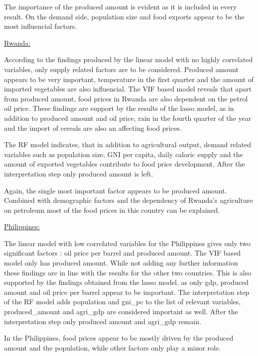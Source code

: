 \documentclass[12pt,a4paper,english]{article}
\begin{document}
The importance of the produced amount is evident as it is included in every result. On the demand side, population size and food exports appear to be the most influencial factors. 

\begin{center} \underline{Rwanda:} \end{center}
According to the findings produced by the linear model with no highly correlated variables, only supply related factors are to be considered. Produced amount appears to be very important, temperature in the first quarter and the amount of imported vegetables are also influencial.
The VIF based model reveals that apart from produced amount, food prices in Rwanda are also dependent on the petrol oil price. 
These findings are support by the results of the lasso model, as in addition to produced amount and oil price, rain in the fourth quarter of the year and the import of cereals are also an affecting food prices.

The RF model indicates, that in addition to agricultural output, demand related variables such as population size, GNI per capita, daily caloric supply and the amount of exported vegetables contribute to food price development. After the interpretation step only produced amount is left.

Again, the single most important factor appears to be produced amount. Combined with demographic factors and the dependency of Rwanda’s agriculture on petroleum most of the food prices in this country can be explained.

\begin{center} \underline{Philippines:} \end{center}

The linear model with low correlated variables for the Philippines gives only two significant factors : oil price per barrel and produced amount. The VIF based model only has produced amount.
While not adding any further information these findings are in line with the results for the other two countries.
This is also supported by the findings obtained from the lasso model, as only gdp, produced amount and oil price per barrel appear to be important.
The interpretation step of the RF model adds population and gni\_pc to the list of relevant variables, produced\_amount and agri\_gdp are considered important as well. After the interpretation step only produced amount and agri\_gdp remain.

In the Philippines, food prices appear to be mostly driven by the produced amount and the population, while other factors only play a minor role.
\end{document}
